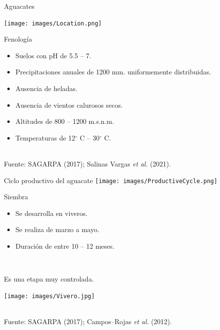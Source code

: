 \documentclass[aspectratio=169]{beamer}
\begin{document}
\begin{frame}{Aguacates}
    \vspace{-1cm}
    \begin{minipage}{0.5\textwidth}
			\hspace{-0.5cm}\texttt{[image: images/Location.png]}
		\end{minipage}%
		\begin{minipage}{0.5\textwidth}
            \begin{block}{Fenología}
                \begin{itemize}
				\item Suelos con pH de 5.5 -- 7.
                    \item Precipitaciones anuales de 1200 mm. uniformemente distribuidas.
                    \item Ausencia de heladas.
                    \item Ausencia de vientos calurosos secos.
                    \item Altitudes de 800 -- 1200 m.s.n.m.
                    \item Temperaturas de 12$^\circ$ C -- 30$^\circ$ C. 
			\end{itemize}
            \end{block}
		\end{minipage}
        \,\\
        \hfill {\scriptsize Fuente: SAGARPA (2017); Salinas Vargas \textit{et al.} (2021).}
\end{frame}



\begin{frame}{Ciclo productivo del aguacate}
    \texttt{[image: images/ProductiveCycle.png]}
\end{frame}

\begin{frame}{Siembra}
    \vspace{-1cm}
		\begin{minipage}{0.5\textwidth}
            \begin{block}{}
                \begin{itemize}
				\item Se desarrolla en viveros.
                    \item Se realiza de marzo a mayo.
                    \item Duración de entre 10 -- 12 meses.
			\end{itemize}
            \end{block}
            \pause\,\\
            \begin{block}{Es una etapa muy controlada.}
            \end{block}
		\end{minipage}%
        \begin{minipage}{0.5\textwidth}
        \centering
\texttt{[image: images/Vivero.jpg]}
		\end{minipage}%
        \,\\
        \hfill {\scriptsize Fuente: SAGARPA (2017); Campos–Rojas \textit{et al.} (2012).}
\end{frame}
\end{document}
